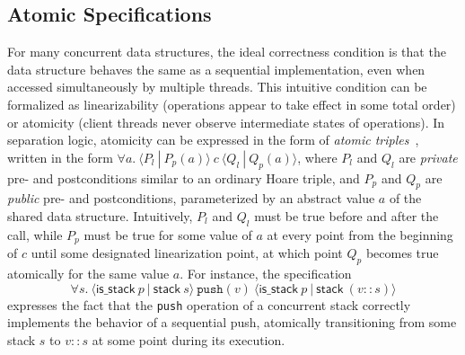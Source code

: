 \documentclass[acmsmall,screen]{acmart}\settopmatter{printfolios=true}
\begin{document}
\subsection{Atomic Specifications}
\label{atomic}
For many concurrent data structures, the ideal correctness condition is that the data structure behaves the same as a sequential implementation, even when accessed simultaneously by multiple threads. This intuitive condition can be formalized as linearizability (operations appear to take effect in some total order) or atomicity (client threads never observe intermediate states of operations). In separation logic, atomicity can be expressed in the form of \emph{atomic triples}~\cite{tada}, written in the form $\forall a.\ \langle P_l\ |\ P_p(a)\rangle\ c\ \langle Q_l\ |\ Q_p(a)\rangle$, where $P_l$ and $Q_l$ are \emph{private} pre- and postconditions similar to an ordinary Hoare triple, and $P_p$ and $Q_p$ are \emph{public} pre- and postconditions, parameterized by an abstract value $a$ of the shared data structure. Intuitively, $P_l$ and $Q_l$ must be true before and after the call, while $P_p$ must be true for some value of $a$ at every point from the beginning of $c$ until some designated linearization point, at which point $Q_p$ becomes true atomically for the same value $a$. For instance, the specification $$\forall s.\ \langle \mathsf{is\_stack}\ p\ |\ \mathsf{stack}\ s\rangle\ \texttt{push}(v)\ \langle \mathsf{is\_stack}\ p\ |\ \mathsf{stack}\ (v :: s)\rangle$$ expresses the fact that the \texttt{push} operation of a concurrent stack correctly implements the behavior of a sequential push, atomically transitioning from some stack $s$ to $v :: s$ at some point during its execution. %
\end{document}
